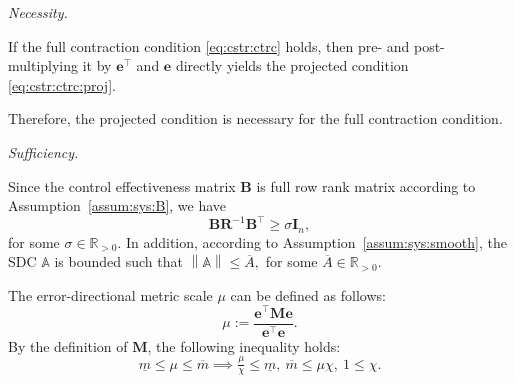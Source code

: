 \documentclass{ifacconf}
\newcommand\R{\mathbb{R}}
\newcommand*{\mv}[1]{\boldsymbol{#1}} %
\newcommand*{\mm}[1]{\boldsymbol{#1}} %
\newcommand*{\norm}[1]{\left\lVert #1 \right\rVert} %
\begin{document}
\begin{pf}

   \emph{Necessity.}

   If the full contraction condition \eqref{eq:cstr:ctrc} holds, then pre- and post-multiplying it by $\mv e^\top$ and $\mv e$ directly yields the projected condition \eqref{eq:cstr:ctrc:proj}.

   Therefore, the projected condition is necessary for the full contraction condition.

   \emph{Sufficiency.}

   Since the control effectiveness matrix $\mm{B}$ is full row rank matrix according to Assumption~\ref{assum:sys:B}, we have 
   \begin{equation}
      \mm{B}\mm{R}^{-1}\mm{B}^\top 
      \ge
      \sigma \mm{I}_n
      ,
   \end{equation}
   for some $\sigma\in\R_{>0}$.
   In addition, according to Assumption~\ref{assum:sys:smooth}, the SDC $\mathbb{A}$ is bounded such that $\norm{\mathbb{A}} \le \overline{A},$ for some $\overline{A}\in\R_{>0}$.

   The error-directional metric scale $\mu$ can be defined as follows:
   \begin{equation}
      \mu
      :=
      \frac{\mv{e}^\top\mm{M}\mv{e}}{\mv{e}^\top\mv{e}}
      .
   \end{equation}
   By the definition of $\mm{M}$, the following inequality holds:
   \begin{equation} \label{eq:mu:bounds}
      \underline{m}
      \le
      \mu
      \le
      \overline{m}
      \implies
      \tfrac{\mu}{\chi}
      \le 
      \underline{m}
      ,\ 
      \overline{m}
      \le
      \mu \chi
      ,\ 
      1
      \le 
      \chi 
      .
   \end{equation}


\end{pf}
\end{document}
